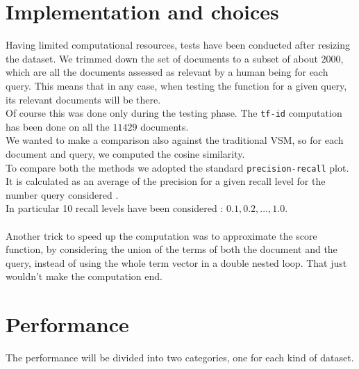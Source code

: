 \documentclass[letterpaper, 10 pt, conference]{ieeeconf}  %
\begin{document}
\section{Implementation and choices}
Having limited computational resources, tests have been conducted after resizing the dataset. We trimmed down the set of documents to a subset of about $2000$, which are all the documents assessed as relevant by a human being for each query. This means that in any case, when testing the function for a given query, its relevant documents will be there.\\
Of course this was done only during the testing phase. The \texttt{tf-id} computation has been done on all the $11429$ documents.\\
We wanted to make a comparison also against the traditional VSM, so for each document and query, we computed the cosine similarity.\\
To compare both the methods we adopted the standard \texttt{precision-recall} plot.
It is calculated as an average of the precision for a given recall level for the number  query considered .\\In particular 10 recall levels have been considered : $ 0.1, 0.2, ... , 1.0 $.\\ \\
Another trick to speed up the computation was to approximate the score function, by considering the union of the terms of both the document and the query, instead of using the whole term vector in a double nested loop. That just wouldn't make the computation end.\\
\section{Performance}
The performance will be divided into two categories, one for each kind of dataset.
\end{document}

